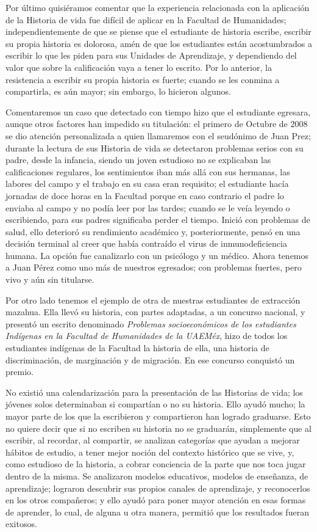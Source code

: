 Por último quisiéramos comentar que la experiencia relacionada con la 
aplicación de la Historia de vida fue difícil de aplicar en la Facultad de Humanidades;
independientemente de que se piense que el estudiante de historia escribe,
escribir su propia historia es dolorosa, amén de que los estudiantes están
acostumbrados a escribir lo que les piden para sus Unidades de Aprendizaje,
y dependiendo del valor que sobre la calificación vaya a tener lo escrito.
Por lo anterior, la resistencia a escribir su propia historia es fuerte;
cuando se les conmina a compartirla, es aún mayor; sin embargo, lo hicieron
algunos.


Comentaremos un caso que detectado con tiempo hizo que el estudiante
egresara, aunque otros factores han impedido su titulación: el primero de
Octubre de 2008 se dio atención personalizada a quien llamaremos con el
seudónimo de Juan Prez; durante la lectura de sus Historia de vida se
detectaron problemas serios con su padre, desde la infancia, siendo un
joven estudioso no se explicaban las calificaciones regulares, los
sentimientos iban más allá con sus hermanas, las labores del campo y el
trabajo en su casa eran requisito; el estudiante hacía jornadas de doce
horas en la Facultad porque en caso contrario el padre lo enviaba al campo
y no podía leer por las tardes; cuando se le veía leyendo o escribiendo,
para sus padres significaba perder el tiempo. Inició con problemas de
salud, ello deterioró su rendimiento académico y, posteriormente, pensó en
una decisión terminal al creer que había contraído el virus de 
inmunodeficiencia humana. La opción fue canalizarlo con un psicólogo y un médico.
Ahora tenemos a Juan Pérez como uno más de nuestros egresados; con problemas fuertes, 
pero vivo y aún sin titularse.


Por otro lado tenemos el ejemplo de otra de nuestras estudiantes de
extracción mazahua. Ella llevó su historia, con partes adaptadas, a un
concurso nacional, y presentó un escrito denominado \textit{Problemas
socioeconómicos de los estudiantes Indígenas en la Facultad de Humanidades
de la UAEMéx}, hizo de todos los estudiantes indígenas de la Facultad la
historia de ella, una historia de discriminación, de marginación y de
migración. En ese concurso conquistó un premio.


No existió una calendarización para la presentación de las Historias de
vida; los jóvenes solos determinaban si compartían o no su historia. Ello
ayudó mucho; la mayor parte de los que la escribieron y compartieron han
logrado graduarse. Esto no quiere decir que si no escriben su historia no
se graduarán, simplemente que al escribir, al recordar, al compartir, se
analizan categorías que ayudan a mejorar hábitos de estudio, a tener mejor
noción del contexto histórico que se vive, y, como estudioso de la historia, a
cobrar conciencia de la parte que nos toca jugar dentro de la misma. Se
analizaron modelos educativos, modelos de enseñanza, de aprendizaje;
lograron descubrir sus propios canales de aprendizaje, y reconocerlos en los
otros compañeros; y ello ayudó para poner mayor atención en esas formas de
aprender, lo cual,  de alguna u otra manera, permitió que los resultados fueran
exitosos.


